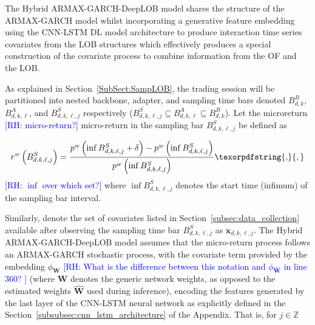 \documentclass[10pt,a4paper,oneside]{article}
\newcommand{\Z}{\mathbb{Z}}
\newcommand{\rh}[1]{\textcolor{blue}{\textsf{[RH: #1]}}}
\providecommand{\DIFaddtex}[1]{{\protect\color{blue} \sf #1}} %
\providecommand{\DIFdeltex}[1]{{\protect\color{red} \scriptsize #1}} %
\providecommand{\DIFaddbegin}{} %
\providecommand{\DIFaddend}{} %
\providecommand{\DIFdelbegin}{} %
\providecommand{\DIFdelend}{} %
\providecommand{\DIFadd}[1]{\texorpdfstring{\DIFaddtex{#1}}{#1}} %
\providecommand{\DIFdel}[1]{\texorpdfstring{\DIFdeltex{#1}}{}} %
\newcommand{\DIFscaledelfig}{0.5}
\newlength{\DIFdelgraphicswidth} %
\newlength{\DIFdelgraphicsheight} %
\newcommand{\DIFaddincludegraphics}[2][]{{\color{blue}\fbox{\DIFOincludegraphics[#1]{#2}}}} %
\newcommand{\DIFdelincludegraphics}[2][]{%
\sbox{\DIFdelgraphicsbox}{\DIFOincludegraphics[#1]{#2}}%
\settoboxwidth{\DIFdelgraphicswidth}{\DIFdelgraphicsbox} %
\settoboxtotalheight{\DIFdelgraphicsheight}{\DIFdelgraphicsbox} %
\scalebox{\DIFscaledelfig}{%
\parbox[b]{\DIFdelgraphicswidth}{\usebox{\DIFdelgraphicsbox}\\[-\baselineskip] \rule{\DIFdelgraphicswidth}{0em}}\llap{\resizebox{\DIFdelgraphicswidth}{\DIFdelgraphicsheight}{%
\setlength{\unitlength}{\DIFdelgraphicswidth}%
\begin{picture}(1,1)%
\thicklines\linethickness{2pt} %
{\color[rgb]{1,0,0}\put(0,0){\framebox(1,1){}}}%
{\color[rgb]{1,0,0}\put(0,0){\line( 1,1){1}}}%
{\color[rgb]{1,0,0}\put(0,1){\line(1,-1){1}}}%
\end{picture}%
}\hspace*{3pt}}} %
} %
\DeclareRobustCommand{\DIFaddbegin}{\DIFOaddbegin \let\includegraphics\DIFaddincludegraphics} %
\DeclareRobustCommand{\DIFaddend}{\DIFOaddend \let\includegraphics\DIFOincludegraphics} %
\DeclareRobustCommand{\DIFdelbegin}{\DIFOdelbegin \let\includegraphics\DIFdelincludegraphics} %
\DeclareRobustCommand{\DIFdelend}{\DIFOaddend \let\includegraphics\DIFOincludegraphics} %
\begin{document}
The Hybrid ARMAX-GARCH-DeepLOB model shares the structure of the ARMAX-GARCH model whilst incorporating a generative feature embedding using the CNN-LSTM DL model architecture to produce interaction time series covariates from the LOB structures which effectively produces a special construction of the covariate process to combine information from the OF and the LOB.

As explained in Section~\ref{SubSect:SampLOB}, the trading session will be partitioned into nested backbone, adapter, and sampling time bars denoted $B^B_{d,k}$, $B^A_{d,k,\ell}$, and $B^S_{d,k,\ell,j}$ respectively ($B^S_{d,k,\ell,j} \subseteq B^A_{d,k,\ell} \subseteq B^B_{d,k}$). Let the \DIFdelbegin \DIFdel{microreturn \rh{micro-return?} }\DIFdelend \DIFaddbegin \DIFadd{micro-return }\DIFaddend in the sampling bar $B^S_{d, k, \ell, j}$ be defined as

$$
    r^w\left( B^S_{d, k, \ell, j} \right) = \frac{p^w\left( \inf B^S_{d, k, \ell, j} + \delta \right) - p^w\left( \inf B^S_{d, k, \ell, j}\right)}{p^w\left( \inf B^S_{d, k, \ell, j}\right)}\DIFaddbegin \DIFadd{,
}\DIFaddend $$
\DIFdelbegin \DIFdel{\rh{$\inf$ over which set?}
}\DIFdelend \DIFaddbegin \DIFadd{where $\inf B^S_{d, k, \ell, j}$ denotes the start time (infimum) of the sampling bar interval.
}\DIFaddend 

Similarly, denote the set of covariates listed in Section~\ref{subsec:data_collection} available after observing the sampling time bar $B^S_{d, k, \ell, j}$ as $\mathbf{x}_{d, k, \ell, j}$. The Hybrid ARMAX-GARCH-DeepLOB model assumes that the micro-return process follows an ARMAX-GARCH stochastic process, with the covariate term provided by the embedding $\phi_{\mathbf{W}}$ \DIFdelbegin \DIFdel{\rh{What is the difference  between this notation and $\phi_{\hat{\mathbf{W}}}$ in line 360? }
}\DIFdelend \DIFaddbegin \DIFadd{(where $\mathbf{W}$ denotes the generic network weights, as opposed to the estimated weights $\hat{\mathbf{W}}$ used during inference), }\DIFaddend encoding the features generated by \DIFaddbegin \DIFadd{the }\DIFaddend last layer of the CNN-LSTM neural network as explicitly defined in the Section~\ref{subsubsec:cnn_lstm_architecture} of the Appendix. That is, for $j \in \Z$
\end{document}
